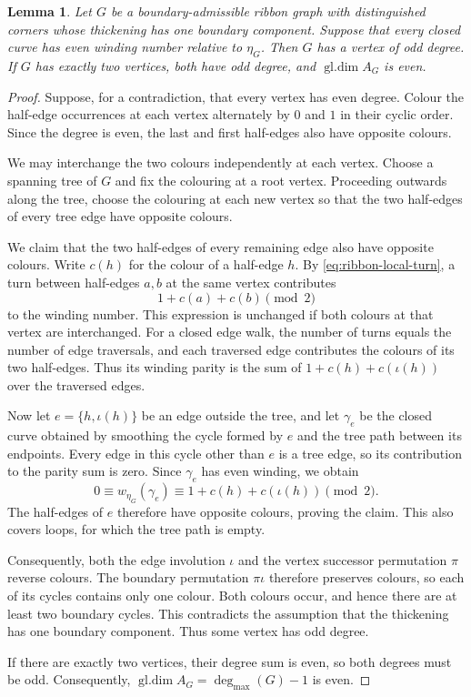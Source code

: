 \documentclass[11pt]{amsart}
\theoremstyle{definition}
\theoremstyle{plain}
\newtheorem{lemma}[lemma]{Lemma}
\theoremstyle{definition}
\theoremstyle{definition}
\newcommand{\gldim}{\operatorname{gl.dim}}
\newcommand{\degmax}{\deg_{\max}}
\begin{document}
\begin{lemma}
\label{lem:one-boundary-parity}
Let $G$ be a boundary-admissible ribbon graph with distinguished corners
whose thickening has one boundary component.  Suppose that every closed
curve has even winding number relative to $\eta_G$.  Then $G$ has a vertex
of odd degree.  If $G$ has exactly two vertices, both have odd degree, and
$\gldim A_G$ is even.
\end{lemma}

\begin{proof}
Suppose, for a contradiction, that every vertex has
even degree. Colour the half-edge occurrences at each
vertex alternately by $0$ and $1$ in their cyclic order.
Since the degree is even, the last and first half-edges
also have opposite colours.

We may interchange the two colours independently at
each vertex. Choose a spanning tree of $G$ and fix
the colouring at a root vertex. Proceeding outwards
along the tree, choose the colouring at each new
vertex so that the two half-edges of every tree edge
have opposite colours.

We claim that the two half-edges of every remaining
edge also have opposite colours. Write $c(h)$ for
the colour of a half-edge $h$.
By \eqref{eq:ribbon-local-turn}, a turn between
half-edges $a,b$ at the same vertex contributes
\[
  1+c(a)+c(b)\pmod2
\]
to the winding number. This expression is unchanged
if both colours at that vertex are interchanged.
For a closed edge walk, the number of turns equals
the number of edge traversals, and each traversed
edge contributes the colours of its two half-edges.
Thus its winding parity is the sum of
$1+c(h)+c(\iota(h))$ over the traversed edges.

Now let $e=\{h,\iota(h)\}$ be an edge outside the tree,
and let $\gamma_e$ be the closed curve obtained by
smoothing the cycle formed by $e$ and the tree path
between its endpoints. Every edge in this cycle
other than $e$ is a tree edge, so its contribution
to the parity sum is zero. Since $\gamma_e$ has
even winding, we obtain
\[
  0\equiv w_{\eta_G}(\gamma_e)
   \equiv1+c(h)+c(\iota(h))\pmod2.
\]
The half-edges of $e$ therefore have opposite colours,
proving the claim. This also covers loops, for which
the tree path is empty.

Consequently, both the edge involution $\iota$ and
the vertex successor permutation $\pi$ reverse
colours. The boundary permutation $\pi\iota$ therefore
preserves colours, so each of its cycles contains
only one colour. Both colours occur, and hence there
are at least two boundary cycles. This contradicts
the assumption that the thickening has one boundary
component. Thus some vertex has odd degree.

If there are exactly two vertices, their degree sum
is even, so both degrees must be odd. Consequently,
$\gldim A_G=\degmax(G)-1$ is even.
\end{proof}
\end{document}
